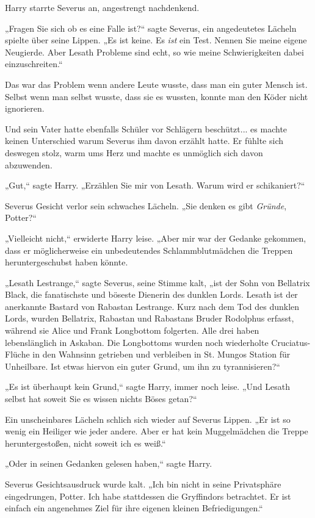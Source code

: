 {Harry starrte Severus an, angestrengt nachdenkend.

„Fragen Sie sich ob es eine Falle ist?“ sagte Severus, ein angedeutetes Lächeln spielte über seine Lippen. „Es ist keine. Es \emph{ist} ein Test. Nennen Sie meine eigene Neugierde. Aber Lesath Probleme sind echt, so wie meine Schwierigkeiten dabei einzuschreiten.“

Das war das Problem wenn andere Leute wusste, dass man ein guter Mensch ist. Selbst wenn man selbst wusste, dass sie es wussten, konnte man den Köder nicht ignorieren.

Und sein Vater hatte ebenfalls Schüler vor Schlägern beschützt... es machte keinen Unterschied warum Severus ihm davon erzählt hatte. Er fühlte sich deswegen stolz, warm ums Herz und machte es unmöglich sich davon abzuwenden.

„Gut,“ sagte Harry. „Erzählen Sie mir von Lesath. Warum wird er schikaniert?“

Severus Gesicht verlor sein schwaches Lächeln. „Sie denken es gibt \emph{Gründe}, Potter?“

„Vielleicht nicht,“ erwiderte Harry leise. „Aber mir war der Gedanke gekommen, dass er möglicherweise ein unbedeutendes Schlammblutmädchen die Treppen heruntergeschubst haben könnte.

„Lesath Lestrange,“ sagte Severus, seine Stimme kalt, „ist der Sohn von Bellatrix Black, die fanatischste und böseste Dienerin des dunklen Lords. Lesath ist der anerkannte Bastard von Rabastan Lestrange. Kurz nach dem Tod des dunklen Lords, wurden Bellatrix, Rabastan und Rabastans Bruder Rodolphus erfasst, während sie Alice und Frank Longbottom folgerten. Alle drei haben lebenslänglich in Askaban. Die Longbottoms wurden noch wiederholte Cruciatus-Flüche in den Wahnsinn getrieben und verbleiben in St. Mungos Station für Unheilbare. Ist etwas hiervon ein guter Grund, um ihn zu tyrannisieren?“

„Es ist überhaupt kein Grund,“ sagte Harry, immer noch leise. „Und Lesath selbst hat soweit Sie es wissen nichts Böses getan?“

Ein unscheinbares Lächeln schlich sich wieder auf Severus Lippen. „Er ist so wenig ein Heiliger wie jeder andere. Aber er hat kein Muggelmädchen die Treppe heruntergestoßen, nicht soweit ich es weiß.“

„Oder in seinen Gedanken gelesen haben,“ sagte Harry.

Severus Gesichtsausdruck wurde kalt. „Ich bin nicht in seine Privatsphäre eingedrungen, Potter. Ich habe stattdessen die Gryffindors betrachtet. Er ist einfach ein angenehmes Ziel für ihre eigenen kleinen Befriedigungen.“

}
